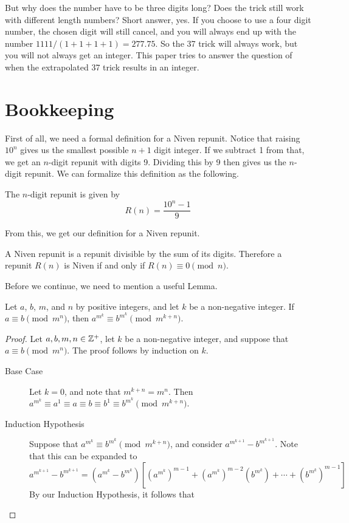 \documentclass{LaTeX/amsart}
\begin{document}
But why does the number have to be three digits long? Does the trick still work with different length numbers? Short answer, yes. If you choose to use a four digit number, the chosen digit will still cancel, and you will always end up with the number $1111/(1+1+1+1)=277.75$. So the 37 trick will always work, but you will not always get an integer. This paper tries to answer the question of when the extrapolated 37 trick results in an integer.

\section{Bookkeeping}

First of all, we need a formal definition for a Niven repunit. Notice that raising $10^n$ gives us the smallest possible $n+1$ digit integer. If we subtract 1 from that, we get an $n$-digit repunit with digits 9. Dividing this by 9 then gives us the $n$-digit repunit. We can formalize this definition as the following.

\begin{definition}
\label{repunit}
The $n$-digit repunit is given by
\begin{equation}
\label{repuniteq}
    R(n)=\frac{10^n-1}{9}
\end{equation}
\end{definition}

From this, we get our definition for a Niven repunit.

\begin{definition}
\label{nivenrepunit}
A Niven repunit is a repunit divisible by the sum of its digits. Therefore a repunit $R(n)$ is Niven if and only if $R(n)\equiv0\pmod{n}$.
\end{definition}

Before we continue, we need to mention a useful Lemma.

\begin{lemma}
\label{useful lemma}
Let $a$, $b$, $m$, and $n$ by positive integers, and let $k$ be a non-negative integer. If $a\equiv b\pmod{m^n}$, then $a^{m^k}\equiv b^{m^k}\pmod{m^{k+n}}$.

\begin{proof}
Let $a,b,m,n\in\mathbb{Z}^+$, let $k$ be a non-negative integer, and suppose that $a\equiv b\pmod{m^n}$. The proof follows by induction on $k$.
\begin{description}
\item[Base Case] Let $k=0$, and note that $m^{k+n}=m^n$. Then $a^{m^k}\equiv a^1\equiv a\equiv b\equiv b^1\equiv b^{m^k}\pmod{m^{k+n}}$.

\vspace{5pt}

\item[Induction Hypothesis] Suppose that $a^{m^k}\equiv b^{m^k}\pmod{m^{k+n}}$, and consider $a^{m^{k+1}}-b^{m^{k+1}}$. Note that this can be expanded to \[a^{m^{k+1}}-b^{m^{k+1}}=\left(a^{m^k}-b^{m^k}\right)\left[\left(a^{m^k}\right)^{m-1}+\left(a^{m^k}\right)^{m-2}\left(b^{m^k}\right)+\cdots+\left(b^{m^k}\right)^{m-1}\right]\] By our Induction Hypothesis, it follows that 
\end{description}
\end{proof}
\end{lemma}

\nocite{*}
\printbibliography[title=References]
\end{document}
